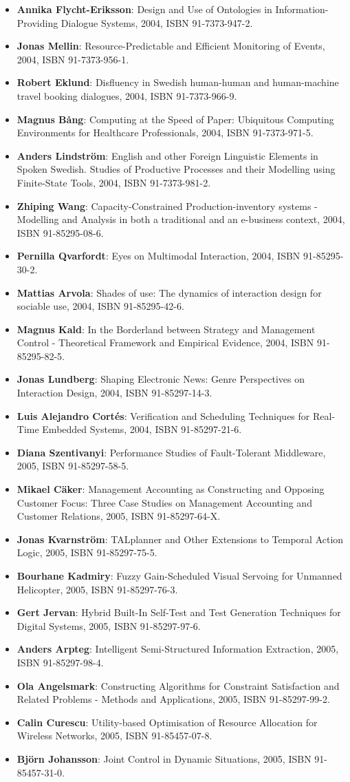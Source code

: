 \documentclass[a4paper,showtrims,twocolumn]{memoir}
\newenvironment{theses}
  {
    \begin{itemize}
      \setlength{\itemsep}{0.2em}
      \setlength{\parskip}{0em}
      \setlength{\parsep}{0em}
  }
  {
    \end{itemize}
  }
\newcommand{\thesis}[5]{\item[No. #1] \textbf{#2}: #3, #4, ISBN #5.}
\begin{document}
\begin{theses}
    \thesis{874}{Annika Flycht-Eriksson}{Design and Use of Ontologies in Information-Providing Dialogue Systems}{2004}{91-7373-947-2}
    \thesis{876}{Jonas Mellin}{Resource-Predictable and Efficient Monitoring of Events}{2004}{91-7373-956-1}
    \thesis{882}{Robert Eklund}{Disfluency in Swedish human-human and human-machine travel booking dialogues}{2004}{91-7373-966-9}
    \thesis{883}{Magnus Bång}{Computing at the Speed of Paper: Ubiquitous Computing Environments for Healthcare Professionals}{2004}{91-7373-971-5}
    \thesis{887}{Anders Lindström}{English and other Foreign Linguistic Elements in Spoken Swedish. Studies of Productive Processes and their Modelling using Finite-State Tools}{2004}{91-7373-981-2}
    \thesis{889}{Zhiping Wang}{Capacity-Constrained Production-inventory systems - Modelling and Analysis in both a traditional and an e-business context}{2004}{91-85295-08-6}
    \thesis{893}{Pernilla Qvarfordt}{Eyes on Multimodal Interaction}{2004}{91-85295-30-2}
    \thesis{900}{Mattias Arvola}{Shades of use: The dynamics of interaction design for sociable use}{2004}{91-85295-42-6}
    \thesis{910}{Magnus Kald}{In the Borderland between Strategy and Management Control - Theoretical Framework and Empirical Evidence}{2004}{91-85295-82-5}
    \thesis{918}{Jonas Lundberg}{Shaping Electronic News: Genre Perspectives on Interaction Design}{2004}{91-85297-14-3}
    \thesis{920}{Luis Alejandro Cortés}{Verification and Scheduling Techniques for Real-Time Embedded Systems}{2004}{91-85297-21-6}
    \thesis{929}{Diana Szentivanyi}{Performance Studies of Fault-Tolerant Middleware}{2005}{91-85297-58-5}
    \thesis{933}{Mikael Cäker}{Management Accounting as Constructing and Opposing Customer Focus: Three Case Studies on Management Accounting and Customer Relations}{2005}{91-85297-64-X}
    \thesis{937}{Jonas Kvarnström}{TALplanner and Other Extensions to Temporal Action Logic}{2005}{91-85297-75-5}
    \thesis{938}{Bourhane Kadmiry}{Fuzzy Gain-Scheduled Visual Servoing for Unmanned Helicopter}{2005}{91-85297-76-3}
    \thesis{945}{Gert Jervan}{Hybrid Built-In Self-Test and Test Generation Techniques for Digital Systems}{2005}{91-85297-97-6}
    \thesis{946}{Anders Arpteg}{Intelligent Semi-Structured Information Extraction}{2005}{91-85297-98-4}
    \thesis{947}{Ola Angelsmark}{Constructing Algorithms for Constraint Satisfaction and Related Problems - Methods and Applications}{2005}{91-85297-99-2}
    \thesis{963}{Calin Curescu}{Utility-based Optimisation of Resource Allocation for Wireless Networks}{2005}{91-85457-07-8}
    \thesis{972}{Björn Johansson}{Joint Control in Dynamic Situations}{2005}{91-85457-31-0}

\end{theses}
\end{document}
